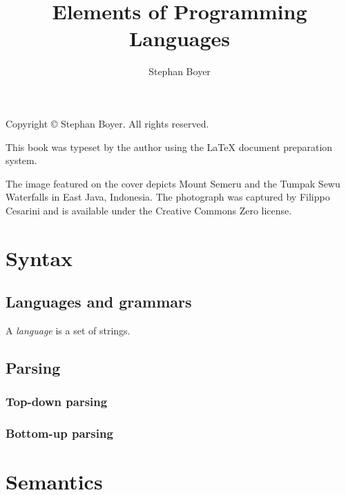 \documentclass[oneside,12pt]{book}
\title{Elements of Programming Languages}
\author{Stephan Boyer}
\date{}
\begin{document}
  

  \frontmatter

  

  \pagebreak
  \hspace{0pt}
  \vfill
    \noindent Copyright \copyright{} \the\year{} Stephan Boyer. All rights reserved.

    \bigbreak

    \noindent This book was typeset by the author using the \LaTeX{} document preparation system.

    \bigbreak

    \noindent The image featured on the cover depicts Mount Semeru and the Tumpak Sewu Waterfalls in East Java, Indonesia. The photograph was captured by Filippo Cesarini and is available under the Creative Commons Zero license.
  \vfill
  \hspace{0pt}
  \pagebreak

  

  \tableofcontents

  \mainmatter

  \ChNameVar{}
  \ChNumVar{\fontsize{60}{62}\selectfont}
  \ChTitleVar{\Huge\bfseries\rm}
  \ChRuleWidth{1pt}

  \part{Syntax}

    \chapter{Languages and grammars}

      A \emph{language} is a set of strings.

    \chapter{Parsing}

      \section{Top-down parsing}

      \section{Bottom-up parsing}

  \part{Semantics}
\end{document}
